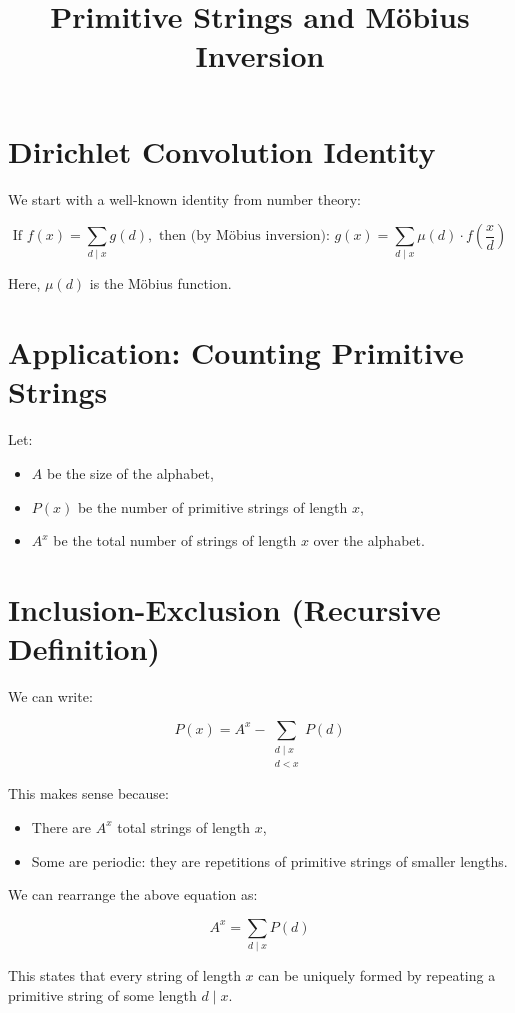 \documentclass[12pt]{article}
\title{Primitive Strings and Möbius Inversion}
\author{}
\date{}
\begin{document}
\maketitle

\section*{Dirichlet Convolution Identity}

We start with a well-known identity from number theory:

\[
\text{If } f(x) = \sum_{d \mid x} g(d),
\text{ then (by Möbius inversion): }
g(x) = \sum_{d \mid x} \mu(d) \cdot f\left(\frac{x}{d}\right)
\]

Here, $\mu(d)$ is the Möbius function.

\section*{Application: Counting Primitive Strings}

Let:
\begin{itemize}
  \item $A$ be the size of the alphabet,
  \item $P(x)$ be the number of primitive strings of length $x$,
  \item $A^x$ be the total number of strings of length $x$ over the alphabet.
\end{itemize}

\section*{Inclusion-Exclusion (Recursive Definition)}

We can write:

\[
P(x) = A^x - \sum_{\substack{d \mid x \\ d < x}} P(d)
\]

This makes sense because:
\begin{itemize}
  \item There are $A^x$ total strings of length $x$,
  \item Some are periodic: they are repetitions of primitive strings of smaller lengths.
\end{itemize}

We can rearrange the above equation as:

\[
A^x = \sum_{d \mid x} P(d) \tag{1}
\]

This states that every string of length $x$ can be uniquely formed by repeating a primitive string of some length $d \mid x$.
\end{document}

